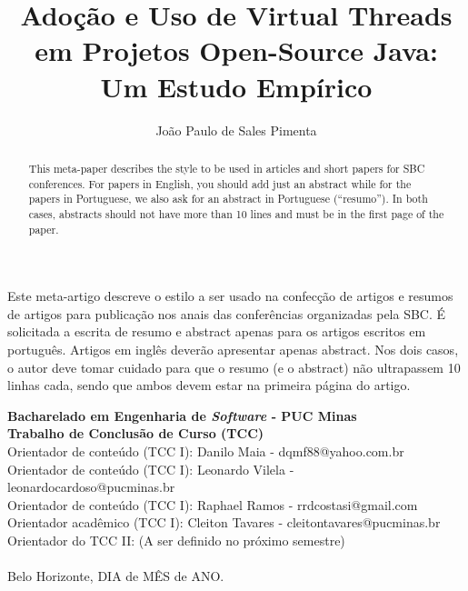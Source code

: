 \documentclass[12pt]{article}
\title{Adoção e Uso de Virtual Threads em Projetos Open-Source Java: Um Estudo Empírico}
\author{João Paulo de Sales Pimenta\inst{1} }
\begin{document}
 

\maketitle

\begin{abstract}
  This meta-paper describes the style to be used in articles and short papers
  for SBC conferences. For papers in English, you should add just an abstract
  while for the papers in Portuguese, we also ask for an abstract in
  Portuguese (``resumo''). In both cases, abstracts should not have more than
  10 lines and must be in the first page of the paper.
\end{abstract}
     
\begin{resumo} 
  Este meta-artigo descreve o estilo a ser usado na confecção de artigos e
  resumos de artigos para publicação nos anais das conferências organizadas
  pela SBC. É solicitada a escrita de resumo e abstract apenas para os artigos
  escritos em português. Artigos em inglês deverão apresentar apenas abstract.
  Nos dois casos, o autor deve tomar cuidado para que o resumo (e o abstract)
  não ultrapassem 10 linhas cada, sendo que ambos devem estar na primeira
  página do artigo.
\end{resumo}


\begin{tcolorbox}
\footnotesize
\textbf{Bacharelado em Engenharia de \emph{Software} - PUC Minas\\
Trabalho de Conclusão de Curso (TCC)} \\

\indent Orientador de conteúdo (TCC I): Danilo Maia - dqmf88@yahoo.com.br \\
Orientador de conteúdo (TCC I): Leonardo Vilela - leonardocardoso@pucminas.br \\
Orientador de conteúdo (TCC I): Raphael Ramos - rrdcostasi@gmail.com\\
Orientador acadêmico (TCC I): Cleiton Tavares - cleitontavares@pucminas.br \\
Orientador do TCC II: (A ser definido no próximo semestre)\\ \\
Belo Horizonte, DIA de MÊS de ANO.
\end{tcolorbox}



% 
% 
% 




% 
\end{document}
